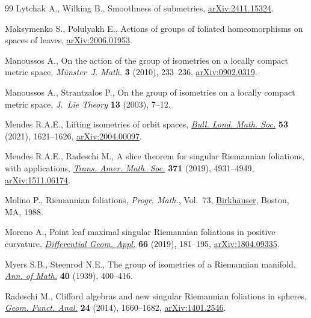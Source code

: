 \documentclass[pdftex]{sigma}
\numberwithin{equation}{section}
\theoremstyle{definition}
\begin{document}
\begin{thebibliography}{99}
Lytchak A., Wilking B., Smoothness of submetries,
 \href{http://arxiv.org/abs/2411.15324}{arXiv:2411.15324}.

Maksymenko S., Polulyakh E., Actions of groups of foliated homeomorphisms on spaces of leaves,
 \href{http://arxiv.org/abs/2006.01953}{arXiv:2006.01953}.

Manoussos A., On the action of the group of isometries on a locally compact
 metric space, \textit{M\"unster~J. Math.} \textbf{3} (2010), 233--236,
 \href{http://arxiv.org/abs/0902.0319}{arXiv:0902.0319}.

Manoussos A., Strantzalos P., On the group of isometries on a locally compact
 metric space, \textit{J.~Lie Theory} \textbf{13} (2003), 7--12.

Mendes R.A.E., Lifting isometries of orbit spaces,
 \href{https://doi.org/10.1112/blms.12514}{\textit{Bull. Lond. Math. Soc.}}
 \textbf{53} (2021), 1621--1626,
 \href{http://arxiv.org/abs/2004.00097}{arXiv:2004.00097}.

Mendes R.A.E., Radeschi M., A slice theorem for singular {R}iemannian
 foliations, with applications,
 \href{https://doi.org/10.1090/tran/7502}{\textit{Trans. Amer. Math. Soc.}}
 \textbf{371} (2019), 4931--4949,
 \href{http://arxiv.org/abs/1511.06174}{arXiv:1511.06174}.

Molino P., Riemannian foliations, \textit{Progr. Math.}, Vol.~73,
 \href{https://doi.org/10.1007/978-1-4684-8670-4}{Birkh\"auser}, Boston, MA,
 1988.

Moreno A., Point leaf maximal singular {R}iemannian foliations in positive
 curvature,
 \href{https://doi.org/10.1016/j.difgeo.2019.06.001}{\textit{Differential
 Geom. Appl.}} \textbf{66} (2019), 181--195,
 \href{http://arxiv.org/abs/1804.09335}{arXiv:1804.09335}.

Myers S.B., Steenrod N.E., The group of isometries of a {R}iemannian manifold,
 \href{https://doi.org/10.2307/1968928}{\textit{Ann. of Math.}} \textbf{40}
 (1939), 400--416.

Radeschi M., Clifford algebras and new singular {R}iemannian foliations in
 spheres, \href{https://doi.org/10.1007/s00039-014-0304-5}{\textit{Geom.
 Funct. Anal.}} \textbf{24} (2014), 1660--1682,
 \href{http://arxiv.org/abs/1401.2546}{arXiv:1401.2546}.


\end{thebibliography}
\end{document}

